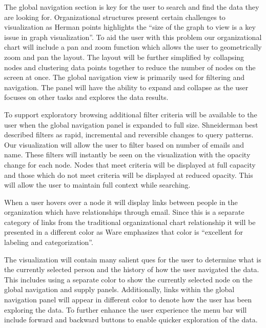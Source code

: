 \documentclass{soups}
\begin{document}
The global navigation section is key for the user to search and find the data they are looking for.  Organizational structures present certain challenges to visualization as Herman points highlights the “size of the graph to view is a key issue in graph visualization”\cite{herman2000graph}.  To aid the user with this problem our organizational chart will include a pan and zoom function which allows the user to geometrically zoom and pan the layout.  The layout will be further simplified by collapsing nodes and clustering data points together to reduce the number of nodes on the screen at once.  The global navigation view is primarily used for filtering and navigation.  The panel will have the ability to expand and collapse as the user focuses on other tasks and explores the data results.

To support exploratory browsing\cite{ahlberg1994visual} additional filter criteria will be available to the user when the global navigation panel is expanded to full size.  Shneiderman best described filters as rapid, incremental and reversible changes to query patterns\cite{ahlberg1994visual}.  Our visualization will allow the user to filter based on number of emails and name.  These filters will instantly be seen on the visualization with the opacity change for each node.  Nodes that meet criteria will be displayed at full capacity and those which do not meet criteria will be displayed at reduced opacity.  This will allow the user to maintain full context while searching.

When a user hovers over a node it will display links between people in the organization which have relationships through email.  Since this is a separate category of links from the traditional organizational chart relationship it will be presented in a different color as Ware emphasizes that color is “excellent for labeling and categorization”\cite{ware2012information}.

The visualization will contain many salient\cite{ware2012information} ques for the user to determine what is the currently selected person and the history of how the user navigated the data.  This includes using a separate color to show the currently selected node on the global navigation and supply panels.  Additionally, links within the global navigation panel will appear in different color to denote how the user has been exploring the data.  To further enhance the user experience the menu bar will include forward and backward buttons to enable quicker exploration of the data.
\end{document}
